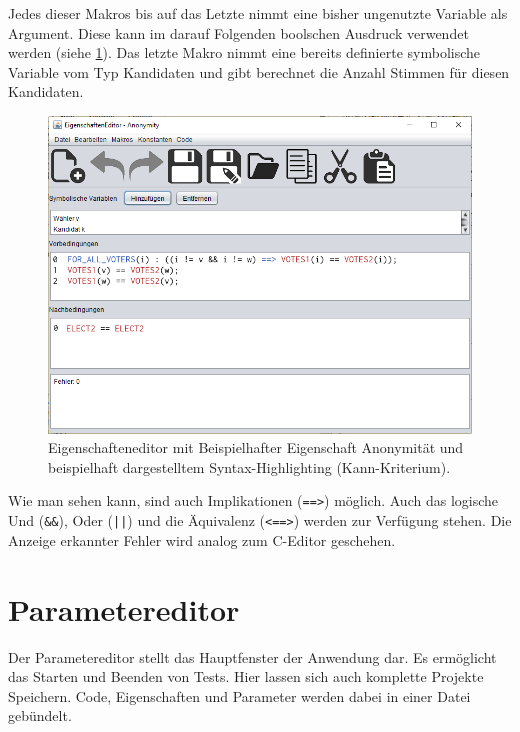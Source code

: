 \documentclass[a4paper]{scrreprt}
\begin{document}
Jedes dieser Makros bis auf das Letzte nimmt eine bisher ungenutzte Variable als Argument. Diese kann im darauf Folgenden boolschen Ausdruck verwendet werden (siehe \ref{Eigenschaften-Editor-Anonymität}). Das letzte Makro nimmt eine bereits definierte symbolische Variable vom Typ Kandidaten und gibt berechnet die Anzahl Stimmen für diesen Kandidaten.

\begin{figure}[H]
\includegraphics[scale=0.5]{Editor-vor-und-nachbedingungen-syntax-highlighting.png}
\caption{Eigenschafteneditor mit Beispielhafter Eigenschaft Anonymität und beispielhaft dargestelltem Syntax-Highlighting (Kann-Kriterium).}
\label{Eigenschaften-Editor-Anonymität}
\end{figure}

Wie man sehen kann, sind auch Implikationen (\verb!==>!) möglich. Auch das logische Und (\verb!&&!), Oder (\verb!||!) und die Äquivalenz (\verb!<==>!) werden zur Verfügung stehen. Die Anzeige erkannter Fehler wird analog zum C-Editor geschehen.

\section{Parametereditor}

Der Parametereditor stellt das Hauptfenster der Anwendung dar. Es ermöglicht das Starten und Beenden von Tests. Hier lassen sich auch komplette Projekte Speichern. Code, Eigenschaften und Parameter werden dabei in einer Datei gebündelt.
\end{document}
